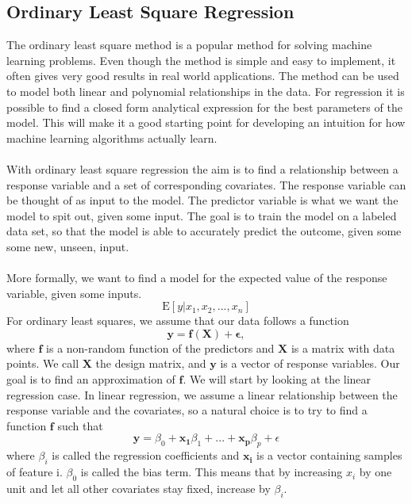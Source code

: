 \subsection{Ordinary Least Square Regression}
The ordinary least square method is a popular method for solving machine learning problems. Even though the method is simple and easy to implement, it often gives very good results in real world applications. The method can be used to model both linear and polynomial relationships in the data. For regression it is possible to find a closed form analytical expression for the best parameters of the model. This will make it a good starting point for developing an intuition for how machine learning algorithms actually learn.
\\
\\
With ordinary least square regression the aim is to find a relationship between a response variable and a set of corresponding covariates. The response variable can be thought of as input to the model. The predictor variable is what we want the model to spit out, given some input. The goal is to train the model on a labeled data set, so that the model is able to accurately predict the outcome, given some some new, unseen, input. 
\\
\\
More formally, we want to find a model for the expected value of the response variable, given some inputs.
\begin{equation}
\text{E}[y|x_1, x_2, ... , x_n]
\end{equation} 
For ordinary least squares, we assume that our data follows a function 
\begin{equation}
    \boldsymbol{y} = \boldsymbol{f}(\boldsymbol{X}) + \boldsymbol{\epsilon},
\end{equation}
where $\boldsymbol{f}$ is a non-random function of the predictors and $\boldsymbol{X}$ is a matrix with data points. We call $\boldsymbol{X}$ the design matrix, and $\boldsymbol{y}$ is a vector of response variables. Our goal is to find an approximation of $\boldsymbol{f}$. 
We will start by looking at the linear regression case. In linear regression, we assume a linear relationship between the response variable and the covariates, so a natural choice is to try to find a function $\boldsymbol{f}$ such that 
\begin{equation}
    \boldsymbol{y} = \beta_0 + \boldsymbol{x_1}\beta_1 + ... + \boldsymbol{x_p}\beta_p + \epsilon
\end{equation}
where $\beta_i$ is called the regression coefficients and $\boldsymbol{x_i}$ is a vector containing samples of feature i. $\beta_0$ is called the bias term. This means that by increasing $x_i$ by one unit and let all other covariates stay fixed,  increase by $\beta_i$. 

